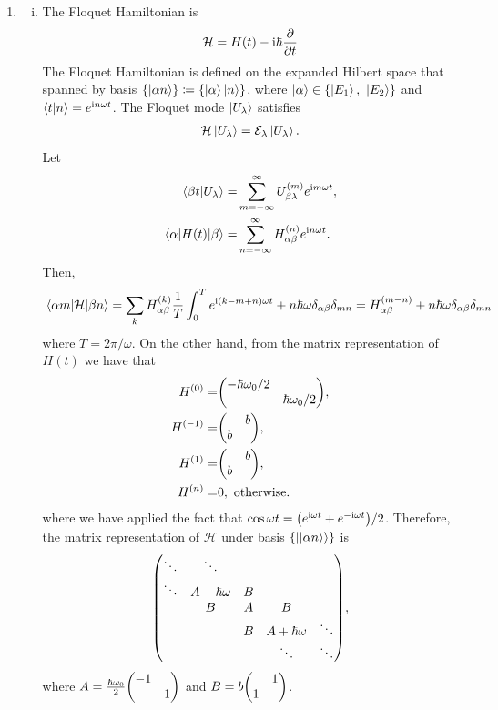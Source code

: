 \documentclass{article}
\newcommand{\iu}{\ensuremath{\mathrm{i}}}
\newcommand{\set}[1]{\ensuremath{\left\{{#1}\right\}}}
\newcommand{\kket}[1]{\ensuremath{\ket{\ket{#1}}}}
\begin{document}
\begin{enumerate}[1.]
  \item
  \begin{enumerate}[(i)]
    \item The Floquet Hamiltonian is
    \begin{align*}
      \mathcal{H} = H(t) - \iu\hbar\pdv{t}
    \end{align*}
    The Floquet Hamiltonian is defined on the expanded Hilbert space that spanned by basis $\set{\ket{\alpha n}} \coloneqq \set{\ket{\alpha}\ket{n}}$, where $\ket{\alpha} \in \set{\ket{E_1},\ \ket{E_2}}$ and $\ip{t}{n} = e^{\iu n \omega t}$. 
    The Floquet mode $\ket{U_\lambda}$ satisfies
    \begin{align*}
      \mathcal{H} \ket{U_\lambda} = \mathcal{E}_\lambda \ket{U_\lambda}.
    \end{align*}
    Let
    \begin{align*}
      {\ip{\beta t}{U_\lambda}} =& \sum_{m=-\infty}^\infty U_{\beta\lambda}^{(m)}e^{\iu m \omega t},\\
      \mel{\alpha}{H(t)}{\beta} =& \sum_{n = -\infty}^{\infty} H_{\alpha\beta}^{(n)}e^{\iu n \omega t}.
    \end{align*}
    Then,
    \begin{align*}
      {\mel{\alpha m }{\mathcal{H}}{\beta n}} = \sum_k H_{\alpha\beta}^{(k)} \frac{1}{T}\int_0^T e^{\iu (k-m+n) \omega t} + n\hbar\omega\delta_{\alpha\beta}\delta_{mn} = H_{\alpha\beta}^{(m-n)} + n\hbar\omega\delta_{\alpha\beta}\delta_{mn} 
    \end{align*}
    where $T = 2\pi / \omega$. 
    On the other hand, from the matrix representation of $H(t)$ we have that 
    \begin{align*}
      H^{(0)} =& \mqty(-\hbar\omega_0/2 & \\ & \hbar\omega_0/2), \\
      H^{(-1)} =& \mqty( & b \\ b & ), \\
      H^{(1)} =& \mqty( & b \\ b & ), \\
      H^{(n)} =& 0, \text{ otherwise.}
    \end{align*}
    where we have applied the fact that $\cos\omega t = \qty(e^{\iu\omega t} + e^{-\iu\omega t})/2$.
    Therefore, the matrix representation of $\mathcal{H}$ under basis $\set{\kket{\alpha n}}$ is
    \begin{align*}
      \mqty(
        \ddots & \ddots           &   &                 &        \\
        \ddots & A - \hbar\omega  & B &                 &        \\
               & B                & A & B               &        \\
               &                  & B & A + \hbar\omega & \ddots \\
               &                  &   & \ddots          & \ddots
        ),
    \end{align*}
    where $A =  \frac{\hbar\omega_0}{2} \mqty(-1 & \\ & 1)$ and $B = b\mqty( & 1 \\ 1 &)$.


\end{enumerate}
\end{enumerate}
\end{document}
